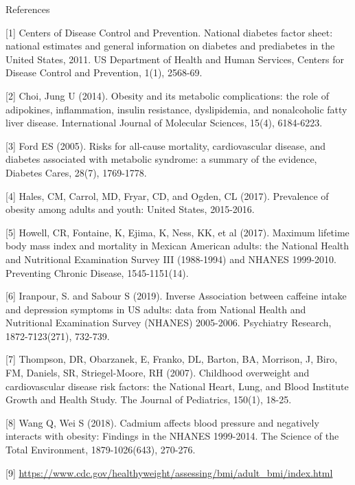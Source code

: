 \documentclass[12pt]{article}
\numberwithin{figure}{section}
\begin{document}
\newpage

{\sf References}

[1] Centers of Disease Control and Prevention. National diabetes factor sheet: national estimates and general information on diabetes and prediabetes in the United States, 2011. US Department of Health and Human Services, Centers for Disease Control and Prevention, 1(1), 2568-69.

[2] Choi, Jung U (2014). Obesity and its metabolic complications: the role of adipokines, inflammation, insulin resistance, dyslipidemia, and nonalcoholic fatty liver disease.  International Journal of Molecular Sciences, 15(4), 6184-6223.

[3] Ford ES (2005). Risks for all-cause mortality, cardiovascular disease, and diabetes associated with metabolic syndrome: a summary of the evidence, Diabetes Cares, 28(7), 1769-1778.

[4] Hales, CM, Carrol, MD, Fryar, CD, and Ogden, CL (2017). Prevalence of obesity among adults and youth: United States, 2015-2016.

[5] Howell, CR, Fontaine, K, Ejima, K, Ness, KK, et al (2017). Maximum lifetime body mass index and mortality in Mexican American adults: the National Health and Nutritional Examination Survey III (1988-1994) and NHANES 1999-2010. Preventing Chronic Disease, 1545-1151(14).

[6] Iranpour, S. and Sabour S (2019). Inverse Association between caffeine intake and depression symptoms in US adults: data from National Health and Nutritional Examination Survey (NHANES) 2005-2006. Psychiatry Research, 1872-7123(271), 732-739.

[7] Thompson, DR, Obarzanek, E, Franko, DL, Barton, BA, Morrison, J, Biro, FM, Daniels, SR, Striegel-Moore, RH (2007).  Childhood overweight and cardiovascular disease risk factors: the National Heart, Lung, and Blood Institute Growth and Health Study. The Journal of Pediatrics, 150(1), 18-25.

[8] Wang Q, Wei S (2018). Cadmium affects blood pressure and negatively interacts with obesity: Findings in the NHANES 1999-2014. The Science of the Total Environment, 1879-1026(643), 270-276.

[9] \url{https://www.cdc.gov/healthyweight/assessing/bmi/adult_bmi/index.html}
\end{document}
